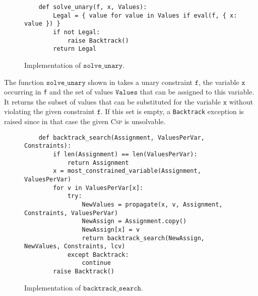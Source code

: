 \begin{figure}[!ht]
\centering
\begin{verbatim}
    def solve_unary(f, x, Values):
        Legal = { value for value in Values if eval(f, { x: value }) }
        if not Legal:
            raise Backtrack()
        return Legal
\end{verbatim}
\vspace*{-0.3cm}
\caption{Implementation of $\texttt{solve\_unary}$.}
\label{fig:Constraint-Propagation-Solver.ipynb:solve_unary}
\end{figure}

The function $\texttt{solve\_unary}$ shown in  takes a unary
constraint $\texttt{f}$, the variable $\texttt{x}$ occurring in \texttt{f} and the set of values $\texttt{Values}$ that can be assigned to this
variable.  It returns the subset of values that can be substituted for the variable $\texttt{x}$
without violating the given constraint $\texttt{f}$.  If this set is empty, a \texttt{Backtrack} exception is
raised since in that case the given \textsc{Csp} is unsolvable.


\begin{figure}[!ht]
\centering
\begin{verbatim}
    def backtrack_search(Assignment, ValuesPerVar, Constraints):
        if len(Assignment) == len(ValuesPerVar):
            return Assignment
        x = most_constrained_variable(Assignment, ValuesPerVar)
        for v in ValuesPerVar[x]:
            try:
                NewValues = propagate(x, v, Assignment, Constraints, ValuesPerVar)
                NewAssign = Assignment.copy()
                NewAssign[x] = v
                return backtrack_search(NewAssign, NewValues, Constraints, lcv)
            except Backtrack:
                continue
        raise Backtrack()
\end{verbatim}
\vspace*{-0.3cm}
\caption{Implementation of $\texttt{backtrack\_search}$.}
\label{fig:Constraint-Propagation-Solver.ipynb:backtrack_search}
\end{figure}

